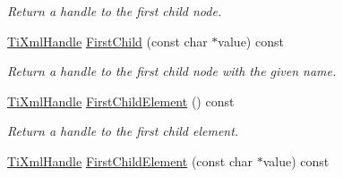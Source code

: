 \begin{DoxyCompactItemize}
\begin{DoxyCompactList}\small\item\em Return a handle to the first child node. \end{DoxyCompactList}\item 
\hyperlink{class_ti_xml_handle}{Ti\+Xml\+Handle} \hyperlink{class_ti_xml_handle_a8c61f64ae9365d89c264f289085541f8}{First\+Child} (const char $\ast$value) const \hypertarget{class_ti_xml_handle_a8c61f64ae9365d89c264f289085541f8}{}\label{class_ti_xml_handle_a8c61f64ae9365d89c264f289085541f8}

\begin{DoxyCompactList}\small\item\em Return a handle to the first child node with the given name. \end{DoxyCompactList}\item 
\hyperlink{class_ti_xml_handle}{Ti\+Xml\+Handle} \hyperlink{class_ti_xml_handle_a24d1112e995e937e4dddb202d4113d4a}{First\+Child\+Element} () const \hypertarget{class_ti_xml_handle_a24d1112e995e937e4dddb202d4113d4a}{}\label{class_ti_xml_handle_a24d1112e995e937e4dddb202d4113d4a}

\begin{DoxyCompactList}\small\item\em Return a handle to the first child element. \end{DoxyCompactList}\item 
\hyperlink{class_ti_xml_handle}{Ti\+Xml\+Handle} \hyperlink{class_ti_xml_handle_af0aea751320f5e430fac6f8fff3b8dd4}{First\+Child\+Element} (const char $\ast$value) const \hypertarget{class_ti_xml_handle_af0aea751320f5e430fac6f8fff3b8dd4}{}\label{class_ti_xml_handle_af0aea751320f5e430fac6f8fff3b8dd4}


\end{DoxyCompactItemize}
